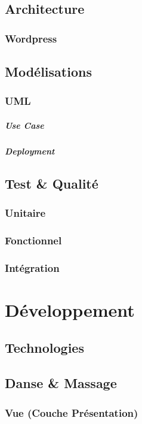 \documentclass[11pt,a4paper]{report}
\begin{document}
	\section{Architecture}
        \subsection{Wordpress}
	\section{Modélisations}
		\subsection{UML}
			\paragraph{Use Case}
			\paragraph{Deployment}
	\section{Test \& Qualité}
		\subsection{Unitaire}
		\subsection{Fonctionnel}
		\subsection{Intégration}

\chapter{Développement}
	\section{Technologies}
	\section{Danse \& Massage}
		\subsection{Vue (Couche Présentation)}
\end{document}
